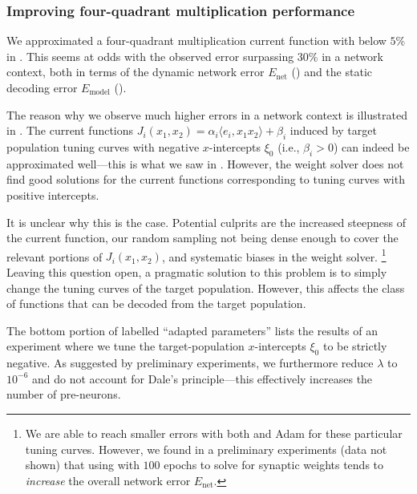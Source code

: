\subsubsection{Improving four-quadrant multiplication performance}
We approximated a four-quadrant multiplication current function with \NRMSE below $5\%$ in .
This seems at odds with the observed error surpassing $30\%$ in a network context, both in terms of the dynamic network error $E_\mathrm{net}$ () and the static decoding error $E_\mathrm{model}$ ().

The reason why we observe much higher errors in a network context is illustrated in .
The current functions $J_i(x_1, x_2) = \alpha_i \langle e_i, x_1 x_2 \rangle + \beta_i$ induced by target population tuning curves with negative $x$-intercepts $\xi_0$ (i.e., $\beta_i > 0$) can indeed be approximated well---this is what we saw in .
However, the weight solver does not find good solutions for the current functions corresponding to tuning curves with positive intercepts.

It is unclear why this is the case.
Potential culprits are the increased steepness of the current function, our random sampling not being dense enough to cover the relevant portions of $J_i(x_1, x_2)$, and systematic biases in the weight solver.%
\footnote{
We are able to reach smaller errors with both \LBFGSB and Adam for these particular tuning curves.
However, we found in a preliminary experiments (data not shown) that using \LBFGSB with $100$ epochs to solve for synaptic weights tends to \emph{increase} the overall network error $E_\mathrm{net}$.
}
Leaving this question open, a pragmatic solution to this problem is to simply change the tuning curves of the target population.
However, this affects the class of functions that can be decoded from the target population.

The bottom portion of  labelled \enquote{adapted parameters} lists the results of an experiment where we tune the target-population $x$-intercepts $\xi_0$ to be strictly negative.
As suggested by preliminary experiments, we furthermore reduce $\lambda$ to $10^{-6}$ and do not account for Dale's principle---this effectively increases the number of pre-neurons.


